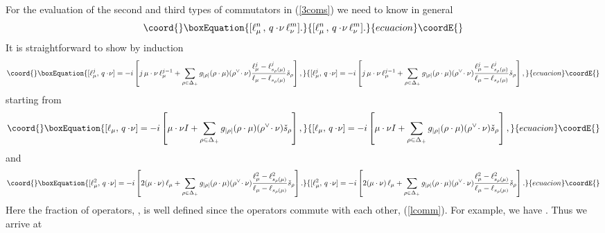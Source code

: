 \documentclass[a4paper,12pt]{article}
\begin{document}
For the evaluation of the second and third types of commutators
in (\ref{3coms}) we need to know in general
\begin{equation}\coord{}\boxEquation{
[\ell_\mu^n\,, \,q\cdot\!\nu\,\ell_\nu^m].
}{
[\ell_\mu^n\,, \,q\cdot\!\nu\,\ell_\nu^m].
}{ecuacion}\coordE{}\end{equation}
It is straightforward to show by induction
\begin{equation}\coord{}\boxEquation{
    [\ell^j_\mu,\,q\cdot\!\nu]=-i\left[j\,\mu\cdot\nu \,\ell_\mu^{j-1}
    +\sum_{\rho\in\Delta_+}g_{|\rho|}(\rho\cdot\mu)(\rho^\vee\!\cdot\nu)
     \frac{\ell_\mu^j-\ell^j_{s_\rho(\mu)}}
      {\ell_\mu-\ell_{s_{\rho}(\mu)}}\check{s}_\rho\right],
\label{ind}
}{
    [\ell^j_\mu,\,q\cdot\!\nu]=-i\left[j\,\mu\cdot\nu \,\ell_\mu^{j-1}
    +\sum_{\rho\in\Delta_+}g_{|\rho|}(\rho\cdot\mu)(\rho^\vee\!\cdot\nu)
     \frac{\ell_\mu^j-\ell^j_{s_\rho(\mu)}}
      {\ell_\mu-\ell_{s_{\rho}(\mu)}}\check{s}_\rho\right],
}{ecuacion}\coordE{}\end{equation}
starting from
\begin{equation}\coord{}\boxEquation{
[\ell_\mu,\,q\cdot\!\nu]=-i\left[\mu\cdot\nu I
+\sum_{\rho\in\Delta_+}g_{|\rho|}(\rho\cdot\mu)
(\rho^\vee\!\cdot\nu)\check{s}_\rho\right],
}{
[\ell_\mu,\,q\cdot\!\nu]=-i\left[\mu\cdot\nu I
+\sum_{\rho\in\Delta_+}g_{|\rho|}(\rho\cdot\mu)
(\rho^\vee\!\cdot\nu)\check{s}_\rho\right],
}{ecuacion}\coordE{}\end{equation}
and
\begin{equation}\coord{}\boxEquation{
 [\ell^2_\mu,\,q\cdot\!\nu]=-i\left[2(\mu\cdot\nu)\, \ell_\mu
+\sum_{\rho\in\Delta_+}g_{|\rho|}(\rho\cdot\mu)(\rho^\vee\!\cdot\nu)
       \frac{\ell_\mu^2-\ell^2_{s_\rho(\mu)}}
     {\ell_\mu-\ell_{s_{\rho}(\mu)}}\check{s}_\rho\right].
}{
 [\ell^2_\mu,\,q\cdot\!\nu]=-i\left[2(\mu\cdot\nu)\, \ell_\mu
+\sum_{\rho\in\Delta_+}g_{|\rho|}(\rho\cdot\mu)(\rho^\vee\!\cdot\nu)
       \frac{\ell_\mu^2-\ell^2_{s_\rho(\mu)}}
     {\ell_\mu-\ell_{s_{\rho}(\mu)}}\check{s}_\rho\right].
}{ecuacion}\coordE{}\end{equation}
Here the fraction of operators,
\coordHE{},
is well defined since the \myHighlight{$\ell$}\coordHE{} operators commute with each other,
(\ref{lcomm}). For example, we have
\coordHE{}.
Thus we arrive at
\end{document}
